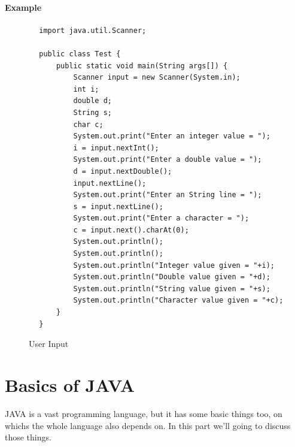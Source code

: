 \documentclass[openany]{book}  %
\begin{document}
\subsection{Example}
\begin{center}
    \begin{verbatim}
        import java.util.Scanner;

        public class Test {
            public static void main(String args[]) {
                Scanner input = new Scanner(System.in);
                int i;
                double d;
                String s;
                char c;
                System.out.print("Enter an integer value = ");
                i = input.nextInt();
                System.out.print("Enter a double value = ");
                d = input.nextDouble();
                input.nextLine();
                System.out.print("Enter an String line = ");
                s = input.nextLine();
                System.out.print("Enter a character = ");
                c = input.next().charAt(0);
                System.out.println();
                System.out.println();
                System.out.println("Integer value given = "+i);
                System.out.println("Double value given = "+d);
                System.out.println("String value given = "+s);
                System.out.println("Character value given = "+c);
            }
        }
    \end{verbatim}
\end{center}
% 
% 
\begin{figure}[htbp]
    \begin{center}
        \caption{User Input\cite{Ref7}\cite{Ref3}}
    \end{center}
\end{figure}

% 
% 
\part{Basics of JAVA}
JAVA is a vast programming language, but it has some basic things too, on
whichs the whole language also depends on. In this part we'll going to discuss those things.
% 
% 
\end{document}
